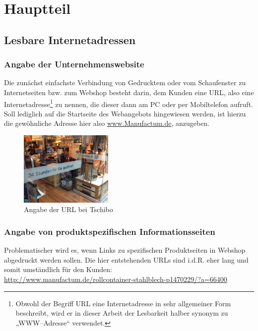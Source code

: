 \section{Hauptteil}
\label{sec:hauptteil}

\subsection{Lesbare Internetadressen}

\subsubsection{Angabe der Unternehmenswebsite}

Die zunächst einfachste Verbindung von Gedrucktem oder vom Schaufenster zu Internetseiten bzw. zum Webshop besteht darin, dem Kunden eine \ac{URL}, also eine Internetadresse\footnote{Obwohl der Begriff URL eine Internetadresse in sehr allgemeiner Form beschreibt, wird er in dieser Arbeit der Lesbarkeit halber synonym zu „WWW--Adresse“ verwendet.} zu nennen, die dieser dann am PC oder per Mobiltelefon aufruft.
Soll lediglich auf die Startseite des Webangebots hingewiesen werden, ist hierzu die gewöhnliche Adresse hier also \url{www.Manufactum.de}, anzugeben. 

\begin{figure}[H]
\begin{center}
\includegraphics[width=0.4\textwidth]{Tschibo-24-7.jpg}
\caption{Angabe der URL bei Tschibo}
\label{pic:tschibourl}
\end{center}
\end{figure}

\subsubsection{Angabe von produktspezifischen Informationsseiten}

Problematischer wird es, wenn Links zu spezifischen Produktseiten in Webshop abgedruckt werden sollen. Die hier entstehenden \ac{URL}s sind i.d.R. eher lang und somit umständlich für den Kunden:\\ \url{http://www.manufactum.de/rollcontainer-stahlblech-p1470229/?a=66400}


